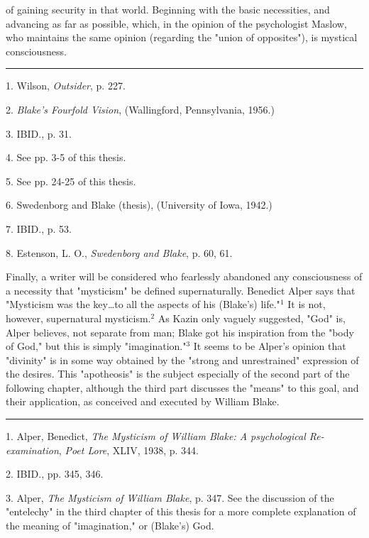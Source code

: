of gaining security in that world. Beginning with the basic necessities, and advancing as far
as possible, which, in the opinion of the psychologist Maslow, who maintains the same opinion (regarding the
"union of opposites"), is mystical consciousness.\par
\vspace*{\fill}
\noindent\rule{0.25\textwidth}{0.4pt}\par
1. Wilson, \textit{Outsider}, p. 227.\par
2. \textit{Blake's Fourfold Vision}, (Wallingford, Pennsylvania, 1956.)\par
3. IBID., p. 31.\par
4. See pp. 3-5 of this thesis.\par
5. See pp. 24-25 of this thesis.\par
6. Swedenborg and Blake (thesis), (University of Iowa, 1942.)\par
7. IBID., p. 53.\par
8. Estenson, L. O., \textit{Swedenborg and Blake}, p. 60, 61.\par

\newpage

Finally, a writer will be considered who fearlessly abandoned any consciousness of a necessity
that "mysticism" be defined supernaturally. Benedict Alper says that
"Mysticism was the key\dots to all the aspects of his (Blake's) life."$^{1}$
It is not, however, supernatural mysticism.$^{2}$ As Kazin only vaguely
suggested, "God" is, Alper believes, not separate from man; Blake got his
inspiration from the "body of God," but this is simply "imagination."$^{3}$ It seems
to be Alper's opinion that "divinity" is in some way obtained by the "strong and
unrestrained" expression of the desires. This "apotheosis" is the subject especially of the
second part of the following chapter, although the third part discusses the "means"
to this goal, and their application, as conceived and executed by William Blake.\par
\vspace*{\fill}
\noindent\rule{0.25\textwidth}{0.4pt}\par
1. Alper, Benedict, \textit{The Mysticism of William Blake: A psychological Re-examination}, \textit{Poet Lore}, XLIV, 1938, p. 344.\par
2. IBID., pp. 345, 346.\par
3. Alper, \textit{The Mysticism of William Blake}, p. 347. See the discussion of the "entelechy" in the
third chapter of this thesis for a more complete explanation of the meaning of "imagination," or (Blake's) God.\par

